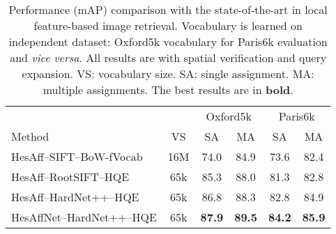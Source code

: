 \documentclass[runningheads]{llncs}
\newcommand{\ra}[1]{\renewcommand{\arraystretch}{#1}}
\begin{document}
\begin{table*}[tb] \ra{1}
\centering
\caption{Performance (mAP) comparison with the state-of-the-art in local feature-based image retrieval. Vocabulary is learned on independent dataset: Oxford5k vocabulary for Paris6k evaluation and \emph{vice versa}. All results are with spatial verification and query expansion. VS: vocabulary size. SA: single assignment. MA: multiple assignments. The best results are in \textbf{bold}.}
\label{tab:ox5kpar6kSOTA}
\setlength{\tabcolsep}{3mm}
\begin{tabular}{lccccc}
\toprule
 & & \multicolumn{2}{c}{Oxford5k} & \multicolumn{2}{c}{Paris6k} \\
 \cmidrule(r){3-4} \cmidrule(r){5-6}
Method & VS & SA & MA & SA & MA\\
\cmidrule(r){1-6}
HesAff--SIFT--BoW-fVocab~\cite{Mikulik-IJCV2013FineVocab} & 16M & 74.0 & 84.9 & 73.6 & 82.4 \\
HesAff--RootSIFT--HQE~\cite{Tolias-PR2014HQE} & 65k & 85.3 & 88.0 & 81.3 & 82.8 \\
HesAff--HardNet++--HQE~\cite{HardNet2017} & 65k & 86.8 & 88.3 & 82.8 & 84.9 \\
\cmidrule(r){1-6}
HesAffNet--HardNet++--HQE & 65k & \textbf{87.9} & \textbf{89.5} & \textbf{84.2} & \textbf{85.9} \\
\bottomrule
\end{tabular}
\end{table*}\begin{table*}[tb] \ra{1.0}
\centering
\caption{Performance (mAP, mP@10) comparison with the state-of-the-art in image retrieval on the R-Oxford and R-Paris benchmarks~\cite{revisitop}. SV: spatial verification. HQE: hamming query expansion. QE:  query expansion.  DFS: global diffusion. 
The best results are in \textbf{bold}.}
\label{tab:Rox5kpar6kSOTA}
\setlength{\tabcolsep}{1mm}
\end{table*}
\end{document}
